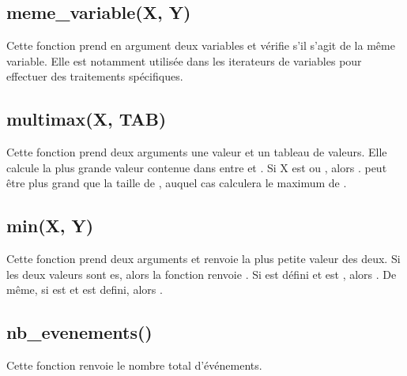 \documentclass[letterpaper,10pt,french]{sphinxmanual}
\begin{document}
\subsection{meme\_variable(X, Y)}
\label{\detokenize{fonctions:meme-variable-x-y}}
\sphinxAtStartPar
Cette fonction prend en argument deux variables et vérifie s’il s’agit de la même
variable.
Elle est notamment utilisée dans les iterateurs de variables pour effectuer des
traitements spécifiques.


\subsection{multimax(X, TAB)}
\label{\detokenize{fonctions:multimax-x-tab}}
\sphinxAtStartPar
Cette fonction prend deux arguments  une valeur et  un tableau
de valeurs.
Elle calcule la plus grande valeur contenue dans  entre  et .
Si X est  ou , alors .
 peut être plus grand que la taille de , auquel cas  calculera le
maximum de .


\subsection{min(X, Y)}
\label{\detokenize{fonctions:min-x-y}}
\sphinxAtStartPar
Cette fonction prend deux arguments et renvoie la plus petite
valeur des deux.
Si les deux valeurs sont es, alors la fonction renvoie
.
Si  est défini et  est , alors . De même,
si  est  et  est defini, alors .


\subsection{nb\_evenements()}
\label{\detokenize{fonctions:nb-evenements}}
\sphinxAtStartPar
Cette fonction renvoie le nombre total d’événements.
\end{document}
